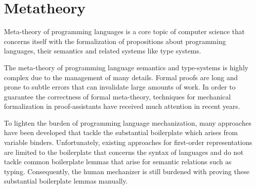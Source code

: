 
\section{Metatheory}
Meta-theory of programming languages is a core topic of computer science that
concerns itself with the formalization of propositions about programming
languages, their semantics and related systems like type systems.

The meta-theory of programming language semantics and type-systems is highly
complex due to the management of many details. Formal proofs are long and prone
to subtle errors that can invalidate large amounts of work. In order to
guarantee the correctness of formal meta-theory, techniques for mechanical
formalization in proof-assistants have received much attention in recent years.


To lighten the burden of programming language mechanization, many approaches
have been developed that tackle the substantial boilerplate which arises from
variable binders. Unfortunately, existing approaches for first-order
representations are limited to the boilerplate that concerns the syntax of
languages and do not tackle common boilerplate lemmas that arise for semantic
relations such as typing. Consequently, the human mechanizer is still burdened
with proving these substantial boilerplate lemmas manually.
